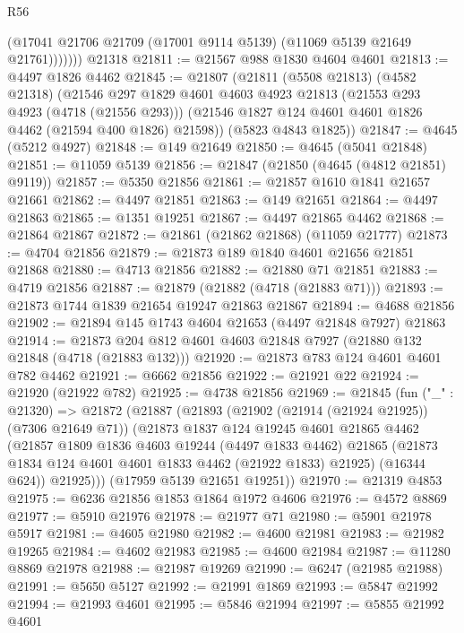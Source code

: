 \begin{lexlean}{R56}
\begin{coremodule}
              (@17041 @21706 @21709 (@17001 @9114 @5139) (@11069 @5139 @21649 @21761)))))))
    @21318
@21811 := @21567 @988 @1830 @4604 @4601
@21813 := @4497 @1826 @4462
@21845 := @21807
    (@21811
      (@5508 @21813)
      (@4582 @21318)
      (@21546
        @297
        @1829
        @4601
        @4603
        @4923
        @21813
        (@21553 @293 @4923 (@4718 (@21556 @293)))
        (@21546 @1827 @124 @4601 @4601 @1826 @4462 (@21594 @400 @1826) @21598))
      (@5823 @4843 @1825))
@21847 := @4645 (@5212 @4927)
@21848 := @149 @21649
@21850 := @4645 (@5041 @21848)
@21851 := @11059 @5139
@21856 := @21847 (@21850 (@4645 (@4812 @21851) @9119))
@21857 := @5350 @21856
@21861 := @21857 @1610 @1841 @21657 @21661
@21862 := @4497 @21851
@21863 := @149 @21651
@21864 := @4497 @21863
@21865 := @1351 @19251
@21867 := @4497 @21865 @4462
@21868 := @21864 @21867
@21872 := @21861 (@21862 @21868) (@11059 @21777)
@21873 := @4704 @21856
@21879 := @21873 @189 @1840 @4601 @21656 @21851 @21868
@21880 := @4713 @21856
@21882 := @21880 @71 @21851
@21883 := @4719 @21856
@21887 := @21879 (@21882 (@4718 (@21883 @71)))
@21893 := @21873 @1744 @1839 @21654 @19247 @21863 @21867
@21894 := @4688 @21856
@21902 := @21894 @145 @1743 @4604 @21653 (@4497 @21848 @7927) @21863
@21914 := @21873 @204 @812 @4601 @4603 @21848 @7927 (@21880 @132 @21848 (@4718 (@21883 @132)))
@21920 := @21873 @783 @124 @4601 @4601 @782 @4462
@21921 := @6662 @21856
@21922 := @21921 @22
@21924 := @21920 (@21922 @782)
@21925 := @4738 @21856
@21969 := @21845
    (fun ("_" : @21320) =>
    @21872
      (@21887
        (@21893
          (@21902 (@21914 (@21924 @21925)) (@7306 @21649 @71))
          (@21873
            @1837
            @124
            @19245
            @4601
            @21865
            @4462
            (@21857
              @1809
              @1836
              @4603
              @19244
              (@4497 @1833 @4462)
              @21865
              (@21873 @1834 @124 @4601 @4601 @1833 @4462 (@21922 @1833) @21925)
              (@16344 @624))
            @21925)))
      (@17959 @5139 @21651 @19251))
@21970 := @21319 @4853
@21975 := @6236 @21856 @1853 @1864 @1972 @4606
@21976 := @4572 @8869
@21977 := @5910 @21976
@21978 := @21977 @71
@21980 := @5901 @21978 @5917
@21981 := @4605 @21980
@21982 := @4600 @21981
@21983 := @21982 @19265
@21984 := @4602 @21983
@21985 := @4600 @21984
@21987 := @11280 @8869 @21978
@21988 := @21987 @19269
@21990 := @6247 (@21985 @21988)
@21991 := @5650 @5127
@21992 := @21991 @1869
@21993 := @5847 @21992
@21994 := @21993 @4601
@21995 := @5846 @21994
@21997 := @5855 @21992 @4601

\end{coremodule}
\end{lexlean}
